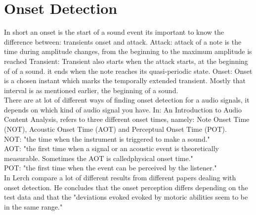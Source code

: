 \section{Onset Detection}
In short an onset is the start of a sound event \citep{ACA} 
its important to know the difference between: transients onset and attack. 
Attack: attack of a note is the time during amplitude changes, from the beginning to the maximum amplitude is reached \citep{ACA}
Transient: Transient also starts when the attack starts, at the beginning of of a sound. it ends when the note reaches its quasi-periodic state. \citep{ACA}
Onset: Onset is a chosen instant which marks the temporally extended transient. \citep{Bello2005} Mostly that interval is as mentioned earlier, the beginning of a sound. 
\\
There are at lot of different ways of  finding onset detection for a audio signals, it depends on which kind of audio signal you have.
In: An Introduction to Audio Content Analysis, \citep{ACA} refers to three different onset times, namely: Note Onset Time (NOT), Acoustic Onset Time (AOT) and Perceptual Onset Time (POT).
\\
NOT: "the time when the instrument is triggered to make a sound." \citep{ACA}
\\
AOT: "the first time when a signal or an acoustic event is theoretically measurable. Sometimes the AOT is calledphysical onset time." \citep{ACA}
\\
POT: "the first time when the event can be perceived by the
listener." \citep{ACA}
\\
In \citep{ACA} Lerch compare a lot of different results from different papers dealing with onset detection. He concludes that the onset perception differs depending on the test data and that the "deviations evoked evoked by motoric abilities seem to be in the same range." \citep{ACA}